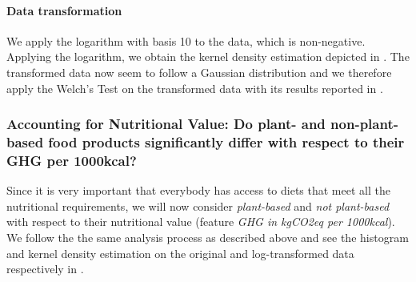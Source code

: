 \documentclass{article}
\begin{document}
\paragraph*{Data transformation}
We apply the logarithm with basis 10 to the data, which is non-negative. Applying the logarithm, we obtain the kernel density estimation depicted in .
The transformed data now seem to follow a  Gaussian distribution and we therefore apply the Welch's Test on the transformed data with its results reported in .

\subsubsection*{Accounting  for Nutritional Value: Do plant- and non-plant-based food products significantly differ with respect to their GHG per 1000kcal?}

Since it is very important that everybody has access to diets that meet all the nutritional requirements, we will now consider \textit{plant-based} and \textit{not plant-based} with respect to their nutritional value (feature \textit{GHG in kgCO2eq per 1000kcal}). We follow the the same analysis process as described above and see the histogram and kernel density estimation on the original and log-transformed data respectively in .
\end{document}
